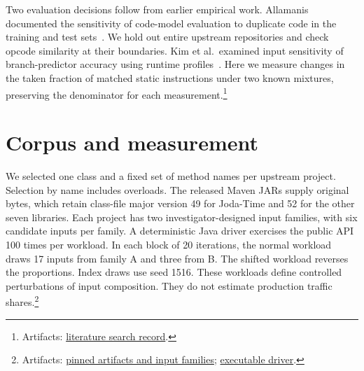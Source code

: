 \documentclass[11pt]{article}
\newcommand{\repocommit}{81d03caebe268d013b3163bcbff31cadabaaec21}
\newcommand{\repourl}{https://github.com/minggu151623/llm_profiling_research}
\newcommand{\repo}[2]{\href{\repourl/blob/\repocommit/#1}{#2}}
\newcommand{\artifacts}[1]{\footnote{Artifacts: #1.}}
\begin{document}
Two evaluation decisions follow from earlier empirical work. Allamanis documented the sensitivity of code-model evaluation to duplicate code in the training and test sets~\citep{duplicates}. We hold out entire upstream repositories and check opcode similarity at their boundaries. Kim et al.\ examined input sensitivity of branch-predictor accuracy using runtime profiles~\citep{kim-input}. Here we measure changes in the taken fraction of matched static instructions under two known mixtures, preserving the denominator for each measurement.\artifacts{\repo{research/literature/search_log.md}{literature search record}}

\section{Corpus and measurement}

We selected one class and a fixed set of method names per upstream project. Selection by name includes overloads. The released Maven JARs supply original bytes, which retain class-file major version 49 for Joda-Time and 52 for the other seven libraries. Each project has two investigator-designed input families, with six candidate inputs per family. A deterministic Java driver exercises the public API 100 times per workload. In each block of 20 iterations, the normal workload draws 17 inputs from family A and three from B. The shifted workload reverses the proportions. Index draws use seed 1516. These workloads define controlled perturbations of input composition. They do not estimate production traffic shares.\artifacts{\repo{experiments/configs/corpus.json}{pinned artifacts and input families}; \repo{java/corpus/Workloads.java}{executable driver}}
\end{document}
